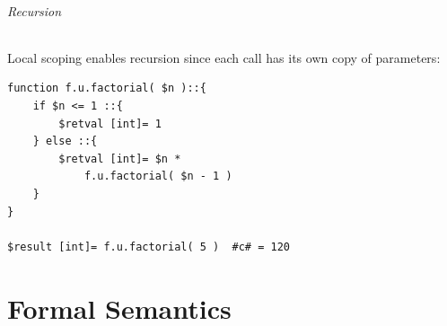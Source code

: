 \paragraph{Recursion}
Local scoping enables recursion since each call has its own copy of parameters:
\begin{verbatim}
function f.u.factorial( $n )::{
    if $n <= 1 ::{
        $retval [int]= 1
    } else ::{
        $retval [int]= $n * 
            f.u.factorial( $n - 1 )
    }
}

$result [int]= f.u.factorial( 5 )  #c# = 120
\end{verbatim}




\part{Formal Semantics}

